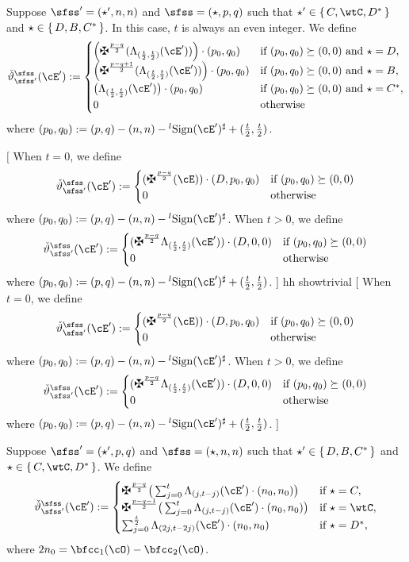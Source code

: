 \documentclass[12pt,a4paper]{amsart}
\newcommand{\trivial}[2][]{\if\relax\detokenize{#1}\relax
  {%
      \color{orange} \vspace{0em} $[$  #2 $]$
      \color{black}
  }
  \else
\ifx#1h
\ifcsname showtrivial\endcsname
{%
    \color{orange} \vspace{0em}  $[$ #2 $]$
    \color{black}
}
\fi
\else {\red Wrong argument!} \fi
\fi
}
\numberwithin{equation}{section}
\theoremstyle{remark}
\def\lsign{{}^l\mathrm{Sign}}
\begin{document}
\medskip

Suppose $\sfss'=(\star',n,n)$ and $\sfss =(\star,p,q)$ such that
$\star'\in \set{ C,\wtC, D^{*}}$  and $\star \in \set{D,B, C^{*}}$.
In this case, $t$ is always an even integer. We define
\begin{equation}\label{eq:LCD}
  \dliftv(\cEp) :=
  \begin{cases}
    \left(\maltese^{\frac{p-q}{2}}(\Lambda_{(\frac{t}{2},\frac{t}{2})}( \cEp))\right)\cdot (p_{0},q_{0}) &
    \text{if } ( p_{0},q_{0} ) \succeq (0,0) \text{ and } \star=D, \\
    \left(\maltese^{\frac{p-q+1}{2}}(\Lambda_{(\frac{t}{2},\frac{t}{2})}( \cEp))\right)\cdot (p_{0},q_{0}) &
    \text{if } ( p_{0},q_{0} ) \succeq (0,0) \text{ and } \star=B, \\
    \big(\Lambda_{(\frac{t}{2},\frac{t}{2})}( \cEp)\big)\cdot (p_{0},q_{0}) &
    \text{if } ( p_{0},q_{0} ) \succeq (0,0) \text{ and } \star=C^{*}, \\
    0 & \text{otherwise}
  \end{cases}
\end{equation}
where $(p_{0}, q_{0})  := (p,q) -(n,n)-\lsign(\cEp)^{\sharp} + (\frac{t}{2},\frac{t}{2})$.

\trivial[h]{
When $t=0$, we define
\[
  \dliftv(\cEp) :=
  \begin{cases}
    (\maltese^{\frac{p-q}{2}}(\cE))\cdot (D,p_{0},q_{0}) &
    \text{if } ( p_{0},q_{0} ) \succeq (0,0) \\
    0 & \text{otherwise}
  \end{cases}
\]
where $(p_{0}, q_{0})  := (p,q) -(n,n)-\lsign(\cEp)^{\sharp} $.
When $t>0$, we define
\[
  \dliftv(\cEp) :=
  \begin{cases}
    (\maltese^{\frac{p-q}{2}}\Lambda_{(\frac{t}{2},\frac{t}{2})}(\cEp)) \cdot (D,0,0) &
    \text{if } ( p_{0},q_{0} ) \succeq (0,0) \\
    0 & \text{otherwise}
  \end{cases}
\]
where $(p_{0}, q_{0})  := (p,q) -(n,n)-\lsign(\cEp)^{\sharp} + (\frac{t}{2},\frac{t}{2})$.
}

\medskip

Suppose $\sfss' =(\star',p,q)$ and $\sfss=(\star,n,n)$ such that
$\star' \in \set{ D,B,C^{*}}$  and $\star \in \set{C,\wtC,D^{*}}$.
We define
\begin{equation}\label{eq:LDC}
  \dliftv(\cEp) :=
  \begin{cases}
    \maltese^{\frac{p-q}{2}}\big(\sum_{j=0}^{t} \Lambda_{(j,t-j)}( \cEp)\cdot (n_{0},n_{0})\big) & \text{if
    } \star = C,\\
    \maltese^{\frac{p-q-1}{2}}\big(\sum_{j=0}^{t} \Lambda_{(j,t-j)}( \cEp)\cdot (n_{0},n_{0})\big) & \text{if
    } \star = \wtC,\\
    \sum_{j=0}^{\frac{t}{2}} \Lambda_{(2j,t-2j)}( \cEp)\cdot (n_{0},n_{0}) & \text{if
    } \star = D^{*},
  \end{cases}
\end{equation}
where $2n_{0} = \bfcc_{1}(\cO)-\bfcc_{2}(\cO)$.
\end{document}
